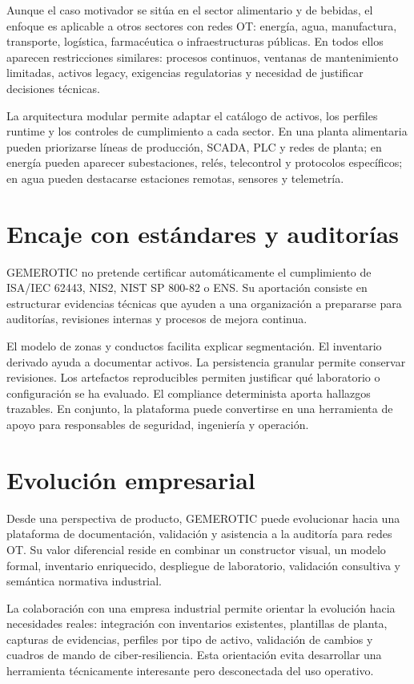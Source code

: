 Aunque el caso motivador se sitúa en el sector alimentario y de bebidas, el enfoque es aplicable a otros sectores con redes OT: energía, agua, manufactura, transporte, logística, farmacéutica o infraestructuras públicas. En todos ellos aparecen restricciones similares: procesos continuos, ventanas de mantenimiento limitadas, activos legacy, exigencias regulatorias y necesidad de justificar decisiones técnicas.

La arquitectura modular permite adaptar el catálogo de activos, los perfiles runtime y los controles de cumplimiento a cada sector. En una planta alimentaria pueden priorizarse líneas de producción, SCADA, PLC y redes de planta; en energía pueden aparecer subestaciones, relés, telecontrol y protocolos específicos; en agua pueden destacarse estaciones remotas, sensores y telemetría.

\section{Encaje con estándares y auditorías} \label{sec:encaje-estandares}

GEMEROTIC no pretende certificar automáticamente el cumplimiento de ISA/IEC 62443, NIS2, NIST SP 800-82 o ENS. Su aportación consiste en estructurar evidencias técnicas que ayuden a una organización a prepararse para auditorías, revisiones internas y procesos de mejora continua.

El modelo de zonas y conductos facilita explicar segmentación. El inventario derivado ayuda a documentar activos. La persistencia granular permite conservar revisiones. Los artefactos reproducibles permiten justificar qué laboratorio o configuración se ha evaluado. El compliance determinista aporta hallazgos trazables. En conjunto, la plataforma puede convertirse en una herramienta de apoyo para responsables de seguridad, ingeniería y operación.

\section{Evolución empresarial} \label{sec:evolucion-empresarial}

Desde una perspectiva de producto, GEMEROTIC puede evolucionar hacia una plataforma de documentación, validación y asistencia a la auditoría para redes OT. Su valor diferencial reside en combinar un constructor visual, un modelo formal, inventario enriquecido, despliegue de laboratorio, validación consultiva y semántica normativa industrial.

La colaboración con una empresa industrial permite orientar la evolución hacia necesidades reales: integración con inventarios existentes, plantillas de planta, capturas de evidencias, perfiles por tipo de activo, validación de cambios y cuadros de mando de ciber-resiliencia. Esta orientación evita desarrollar una herramienta técnicamente interesante pero desconectada del uso operativo.
